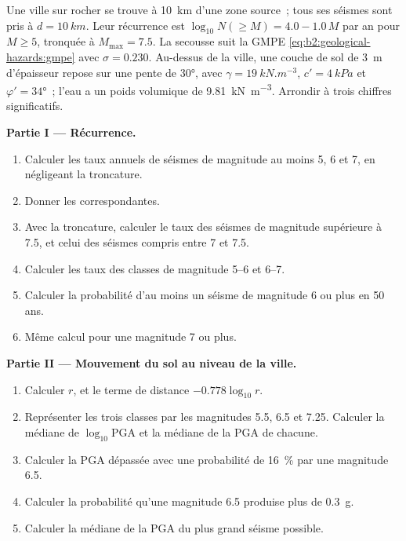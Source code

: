 \begin{problem}\label{pb:b2:geological-hazards:1}
Une ville sur rocher se trouve à \qty{10}{km} d'une zone source~; tous ses séismes sont pris à
$d = \qty{10}{km}$. Leur récurrence est $\log_{10} N(\geq M) = 4.0 - 1.0\,M$ par an pour $M \geq 5$,
tronquée à $M_{\max} = 7.5$. La secousse suit la GMPE \eqref{eq:b2:geological-hazards:gmpe} avec
$\sigma = 0.230$. Au-dessus de la ville, une couche de sol de \qty{3}{m} d'épaisseur repose sur une
pente de \ang{30}, avec $\gamma = \qty{19}{kN.m^{-3}}$, $c' = \qty{4}{kPa}$ et $\varphi' = \ang{34}$~;
l'eau a un poids volumique de \qty{9.81}{kN.m^{-3}}. Arrondir à trois chiffres significatifs.

\noindent\textbf{Partie I --- Récurrence.}
\begin{enumerate}
\item Calculer les taux annuels de séismes de magnitude
au moins 5, 6 et 7, en négligeant la troncature.
\item Donner les  correspondantes.
\item Avec la troncature, calculer le taux des séismes de magnitude
supérieure à 7.5, et celui des séismes compris entre 7 et 7.5.
\item Calculer les taux des classes de magnitude 5--6 et 6--7.
\item Calculer la probabilité d'au moins un séisme de magnitude 6 ou plus en 50 ans.
\item Même calcul pour une magnitude 7 ou plus.
\end{enumerate}

\noindent\textbf{Partie II --- Mouvement du sol au niveau de la ville.}
\begin{enumerate}[resume]
\item Calculer $r$, et le terme de distance $-0.778\log_{10} r$.
\item Représenter les trois classes par les magnitudes 5.5, 6.5 et 7.25. Calculer
la médiane de $\log_{10}\mathrm{PGA}$ et la médiane de la PGA de chacune.
\item Calculer la PGA dépassée avec une probabilité de \qty{16}{\percent} par une magnitude 6.5.
\item Calculer la probabilité qu'une magnitude 6.5 produise plus de \qty{0.3}{g}.
\item Calculer la médiane de la PGA du plus grand séisme possible.
\end{enumerate}


\end{problem}
